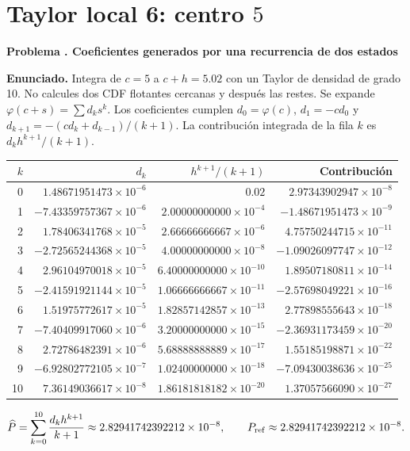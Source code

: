 \documentclass[11pt,a4paper]{article}
\theoremstyle{definition}
\newcounter{problema}
\newenvironment{resuelto}[1]{\refstepcounter{problema}\par\medskip\Needspace{6\baselineskip}\textbf{Problema \theproblema. #1}\par}{\par\medskip}
\begin{document}
\section{\texorpdfstring{Taylor local 6: centro $5$}{Taylor local 6: centro 5}}
\begin{resuelto}{Coeficientes generados por una recurrencia de dos estados}
\textbf{Enunciado.} Integra de $c=5$ a $c+h=5.02$ con un Taylor de densidad de grado 10. No calcules dos CDF flotantes cercanas y después las restes.
Se expande $\varphi(c+s)=\sum d_ks^k$. Los coeficientes cumplen $d_0=\varphi(c)$, $d_1=-cd_0$ y $d_{k+1}=-(cd_k+d_{k-1})/(k+1)$. La contribución integrada de la fila $k$ es $d_kh^{k+1}/(k+1)$.

\begin{center}\small\begin{tabular}{rrrr}
\toprule
$k$&$d_k$&$h^{k+1}/(k+1)$&Contribución\\
\midrule
0&$1.48671951473\times10^{-6}$&$0.02$&$2.97343902947\times10^{-8}$\\
1&$-7.43359757367\times10^{-6}$&$2.00000000000\times10^{-4}$&$-1.48671951473\times10^{-9}$\\
2&$1.78406341768\times10^{-5}$&$2.66666666667\times10^{-6}$&$4.75750244715\times10^{-11}$\\
3&$-2.72565244368\times10^{-5}$&$4.00000000000\times10^{-8}$&$-1.09026097747\times10^{-12}$\\
4&$2.96104970018\times10^{-5}$&$6.40000000000\times10^{-10}$&$1.89507180811\times10^{-14}$\\
5&$-2.41591921144\times10^{-5}$&$1.06666666667\times10^{-11}$&$-2.57698049221\times10^{-16}$\\
6&$1.51975772617\times10^{-5}$&$1.82857142857\times10^{-13}$&$2.77898555643\times10^{-18}$\\
7&$-7.40409917060\times10^{-6}$&$3.20000000000\times10^{-15}$&$-2.36931173459\times10^{-20}$\\
8&$2.72786482391\times10^{-6}$&$5.68888888889\times10^{-17}$&$1.55185198871\times10^{-22}$\\
9&$-6.92802772105\times10^{-7}$&$1.02400000000\times10^{-18}$&$-7.09430038636\times10^{-25}$\\
10&$7.36149036617\times10^{-8}$&$1.86181818182\times10^{-20}$&$1.37057566090\times10^{-27}$\\
\bottomrule\end{tabular}\end{center}
\[
\widehat P=\sum_{k=0}^{10}\frac{d_kh^{k+1}}{k+1}\approx2.82941742392212\times10^{-8},\qquad P_{\rm ref}\approx2.82941742392212\times10^{-8}.
\]
\end{resuelto}
\end{document}
